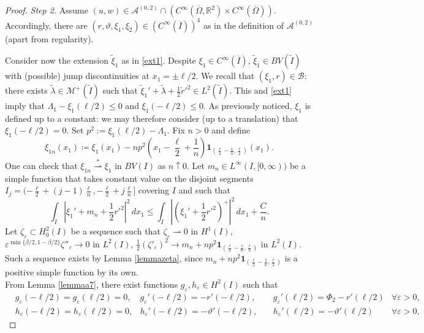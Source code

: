 \documentclass[a4, 11pt, reqno, final]{amsart}
\newcommand{\calA}{\mathcal{A}}
\newcommand{\calB}{\mathcal{B}}
\newcommand{\calM}{\mathcal{M}}
\newcommand{\bbR}{\mathbb{R}}
\newcommand\e{\varepsilon}
\newcommand\weakstar{\stackrel{\ast }{\rightharpoonup}}  %
\newcommand\weak{\rightharpoonup} %
\theoremstyle{plain}%
\begin{document}
\begin{proof}
		\textit{Step 2.}
		Assume $(u,w) \in \calA^{(0,2)}\cap (C^\infty(\overline{\Omega}, \bbR^2)\times C^\infty(\overline{\Omega}))$. Accordingly, there are $(r,\vartheta, \xi_1, \xi_2) \in (C^\infty(\overline{I}))^4$ as in the definition of $\calA^{(0,2)}$ (apart from regularity).

		Consider now the extension $\widetilde{\xi}_1$ as in \eqref{ext1}.
		Despite $\xi_1 \in C^\infty(\overline{I})$, $\widetilde{\xi}_1 \in BV(\widetilde{I})$ with (possible) jump discontinuities at $x_1 = \pm \ell/2$. We recall that $(\xi_1, r) \in \calB$: there exists $\widetilde{\lambda} \in \calM^+(\widetilde{I})$ such that
		$\widetilde{\xi}_1' + \widetilde{\lambda} + \frac12\widetilde{r}'^2 \in L^2(\widetilde{I})$. This and \eqref{ext1} imply that $\Lambda_1 - \xi_1(\ell/2)\leq 0$ and $\xi_1(-\ell/2)\leq 0$. As previously noticed, $\xi_1$ is defined up to a constant: we may therefore consider (up to a translation) that $\xi_1(-\ell/2)=0$.
		Set $p^2 := \xi_1(\ell/2) - \Lambda_1$. Fix $n>0$ and define
		$$ \xi_{1n}(x_1)\coloneqq
		\xi_1(x_1) - n p^2 (x_1 - \frac{\ell}{2} + \frac{1}{n}) \mathbf{1}_{(\frac{\ell}{2} - \frac{1}{n}, \frac{\ell}{2})}(x_1).$$
		One can check that $\xi_{1n} \weakstar \xi_1$ in $BV(I)$ as $n\uparrow 0$.
		Let $m_n \in L^\infty(I, [0,\infty))$ be a simple function that takes constant value on the disjoint segments $I_j = (-\frac{\ell}{2} + (j-1)\frac{\ell}{n}, -\frac{\ell}{2} + j\frac{\ell}{n}]$ covering $I$ and such that
		\begin{equation}\label{Cn}\int_I |\xi_1' + m_n + \frac12 r'^2|^2 \, dx_1 \leq  \int_I |(\xi_1' + \frac12 r'^2)^+|^2 \, dx_1 + \frac{C}{n}.\end{equation}
		Let $\zeta_\e \subset H^2_0(I)$ be a sequence such that $\zeta_\e \weak 0$ in $H^1(I)$, $\e^{\min\{\beta/2,1-\beta/2\}}\zeta''_\e \to 0$ in $L^2(I)$, $\frac12(\zeta'_\e)^2 \to m_n + n p^2\mathbf{1}_{(\frac{\ell}{2}-\frac{1}{n}, \frac{\ell}{2})}$ in $L^2(I)$. Such a sequence exists by Lemma \ref{lemmazeta}, since $m_n + n p^2\mathbf{1}_{(\frac{\ell}{2}-\frac{1}{n}, \frac{\ell}{2})}$ is a positive simple function by its own.\\
		From Lemma \ref{lemmaa7}, there exist functions $g_\e, h_\e \in H^2(I)$ such that
		\begin{align*}
			&g_\e(-\ell/2) = g_\e(\ell/2) = 0, & g_\e'(-\ell/2)= -r'(-\ell/2), & \quad g_\e'(\ell/2)=\Phi_2 - r'(\ell/2) & \forall \e > 0,\\
			&h_\e(-\ell/2) = h_\e(\ell/2) = 0, & h_\e'(-\ell/2)= -\vartheta'(-\ell/2), & \quad h_\e'(\ell/2)=-\vartheta'(\ell/2) & \forall \e > 0,

\end{align*}
\end{proof}
\end{document}
